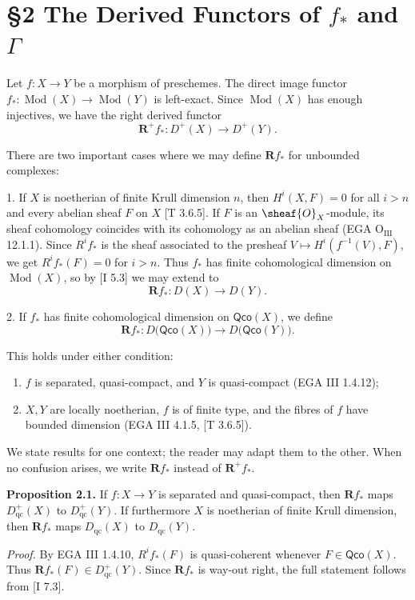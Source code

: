 \setcounter{page}{87}
\section{\S2 The Derived Functors of $f_*$ and $\Gamma$}

Let $f\colon X\to Y$ be a morphism of preschemes.
The direct image functor $f_*\colon \operatorname{Mod}(X)\to\operatorname{Mod}(Y)$ is left-exact.
Since $\operatorname{Mod}(X)$ has enough injectives, we have the right derived functor
\[
\mathbf{R}^+ f_*\colon D^+(X)\to D^+(Y).
\]

There are two important cases where we may define $\mathbf{R}f_*$ for unbounded complexes:

1. If $X$ is noetherian of finite Krull dimension $n$, then $H^i(X,F)=0$ for all $i>n$ and every abelian sheaf $F$ on $X$ [T 3.6.5].
If $F$ is an $\sheaf{O}_X$-module, its sheaf cohomology coincides with its cohomology as an abelian sheaf (EGA $\mathrm{O_{III}}$ 12.1.1).
Since $R^i f_*$ is the sheaf associated to the presheaf $V\mapsto H^i(f^{-1}(V),F)$, we get $R^i f_*(F)=0$ for $i>n$.
Thus $f_*$ has finite cohomological dimension on $\operatorname{Mod}(X)$, so by [I 5.3] we may extend to
\[
\mathbf{R}f_*\colon D(X)\to D(Y).
\]

\setcounter{page}{88}
2. If $f_*$ has finite cohomological dimension on $\mathsf{Qco}(X)$, we define
\[
\mathbf{R}f_*\colon D\big(\mathsf{Qco}(X)\big)\to D\big(\mathsf{Qco}(Y)\big).
\]

This holds under either condition:
\begin{enumerate}
\item[(a)] $f$ is separated, quasi-compact, and $Y$ is quasi-compact (EGA III 1.4.12);
\item[(b)] $X,Y$ are locally noetherian, $f$ is of finite type, and the fibres of $f$ have bounded dimension (EGA III 4.1.5, [T 3.6.5]).
\end{enumerate}

We state results for one context; the reader may adapt them to the other.
When no confusion arises, we write $\mathbf{R}f_*$ instead of $\mathbf{R}^+f_*$.

\textbf{Proposition 2.1.}
If $f\colon X\to Y$ is separated and quasi-compact, then $\mathbf{R}f_*$ maps $D_{\mathrm{qc}}^+(X)$ to $D_{\mathrm{qc}}^+(Y)$.
If furthermore $X$ is noetherian of finite Krull dimension, then $\mathbf{R}f_*$ maps $D_{\mathrm{qc}}(X)$ to $D_{\mathrm{qc}}(Y)$.

\textit{Proof.}
By EGA III 1.4.10, $R^i f_*(F)$ is quasi-coherent whenever $F\in\mathsf{Qco}(X)$.
Thus $\mathbf{R}f_*(F)\in D_{\mathrm{qc}}^+(Y)$.
Since $\mathbf{R}f_*$ is way-out right, the full statement follows from [I 7.3].

